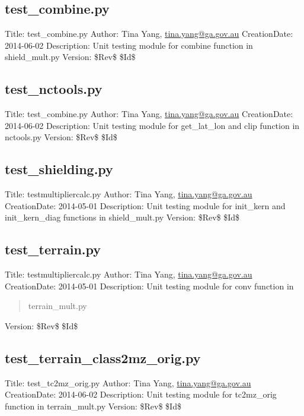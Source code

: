\documentclass[letterpaper,10pt,english]{sphinxmanual}
\begin{document}
\subsection{test\_combine.py}
\label{docs/tests:module-test_combine}\label{docs/tests:test-combine-py}
Title: test\_combine.py 
Author: Tina Yang, \href{mailto:tina.yang@ga.gov.au}{tina.yang@ga.gov.au} 
CreationDate: 2014-06-02
Description: Unit testing module for combine function in shield\_mult.py 
Version: \$Rev\$ 
\$Id\$


\subsection{test\_nctools.py}
\label{docs/tests:module-test_nctools}\label{docs/tests:test-nctools-py}
Title: test\_combine.py 
Author: Tina Yang, \href{mailto:tina.yang@ga.gov.au}{tina.yang@ga.gov.au} 
CreationDate: 2014-06-02
Description: Unit testing module for get\_lat\_lon and clip function
in nctools.py 
Version: \$Rev\$ 
\$Id\$


\subsection{test\_shielding.py}
\label{docs/tests:test-shielding-py}\label{docs/tests:module-test_shielding}
Title: testmultipliercalc.py 
Author: Tina Yang, \href{mailto:tina.yang@ga.gov.au}{tina.yang@ga.gov.au} 
CreationDate: 2014-05-01
Description: Unit testing module for init\_kern and init\_kern\_diag functions
in shield\_mult.py 
Version: \$Rev\$ 
\$Id\$


\subsection{test\_terrain.py}
\label{docs/tests:module-test_terrain}\label{docs/tests:test-terrain-py}
Title: testmultipliercalc.py 
Author: Tina Yang, \href{mailto:tina.yang@ga.gov.au}{tina.yang@ga.gov.au} 
CreationDate: 2014-05-01
Description: Unit testing module for conv function in
\begin{quote}

terrain\_mult.py
\end{quote}

Version: \$Rev\$ 
\$Id\$


\subsection{test\_terrain\_class2mz\_orig.py}
\label{docs/tests:test-terrain-class2mz-orig-py}\label{docs/tests:module-test_terrain_class2mz_orig}
Title: test\_tc2mz\_orig.py 
Author: Tina Yang, \href{mailto:tina.yang@ga.gov.au}{tina.yang@ga.gov.au} 
CreationDate: 2014-06-02
Description: Unit testing module for tc2mz\_orig function in terrain\_mult.py 
Version: \$Rev\$ 
\$Id\$
\end{document}
